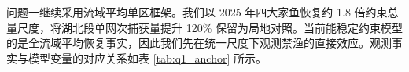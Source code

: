 问题一继续采用流域平均单区框架。我们以 2025 年四大家鱼恢复约 1.8 倍约束总量尺度，将湖北段单网次捕获量提升 120\% 保留为局地对照。当前能稳定约束模型的是全流域平均恢复事实，因此我们先在统一尺度下观测禁渔的直接效应。观测事实与模型变量的对应关系如表 \ref{tab:q1_anchor} 所示。

